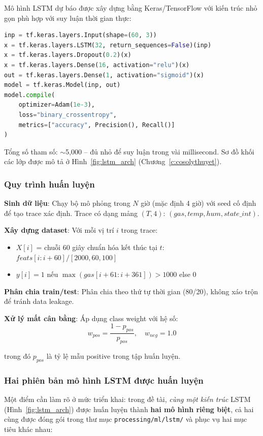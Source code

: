 Mô hình LSTM dự báo được xây dựng bằng Keras/TensorFlow với kiến trúc nhỏ gọn phù hợp với suy luận thời gian thực:

\begin{lstlisting}[language=Python, caption={Định nghĩa kiến trúc LSTM}]
inp = tf.keras.layers.Input(shape=(60, 3))
x = tf.keras.layers.LSTM(32, return_sequences=False)(inp)
x = tf.keras.layers.Dropout(0.2)(x)
x = tf.keras.layers.Dense(16, activation="relu")(x)
out = tf.keras.layers.Dense(1, activation="sigmoid")(x)
model = tf.keras.Model(inp, out)
model.compile(
    optimizer=Adam(1e-3),
    loss="binary_crossentropy",
    metrics=["accuracy", Precision(), Recall()]
)
\end{lstlisting}

Tổng số tham số: $\sim$5,000 – đủ nhỏ để suy luận trong vài millisecond. Sơ đồ khối các lớp được mô tả ở Hình~\ref{fig:lstm_arch} (Chương~\ref{c:cosolythuyet}).

\subsubsection{Quy trình huấn luyện}

\textbf{Sinh dữ liệu}: Chạy bộ mô phỏng trong $N$ giờ (mặc định 4 giờ) với seed cố định để tạo trace xác định. Trace có dạng mảng $(T, 4)$: $(gas, temp, hum, state\_int)$.

\textbf{Xây dựng dataset}: Với mỗi vị trí $i$ trong trace:
\begin{itemize}
  \item $X[i]$ = chuỗi 60 giây chuẩn hóa kết thúc tại $t$: $feats[i:i+60] / [2000, 60, 100]$
  \item $y[i] = 1$ nếu $\max(gas[i+61:i+361]) > 1000$ else $0$
\end{itemize}

\textbf{Phân chia train/test}: Phân chia theo thứ tự thời gian (80/20), không xáo trộn để tránh data leakage.

\textbf{Xử lý mất cân bằng}: Áp dụng class weight với hệ số:
\[w_{pos} = \frac{1 - p_{pos}}{p_{pos}}, \quad w_{neg} = 1.0\]

trong đó $p_{pos}$ là tỷ lệ mẫu positive trong tập huấn luyện.

\subsubsection{Hai phiên bản mô hình LSTM được huấn luyện}
\label{sssec:lstm_two_models}

Một điểm cần làm rõ ở mức triển khai: trong đề tài, \emph{cùng một kiến trúc} LSTM (Hình~\ref{fig:lstm_arch}) được huấn luyện thành \textbf{hai mô hình riêng biệt}, cả hai cùng được đóng gói trong thư mục \texttt{processing/ml/lstm/} và phục vụ hai mục tiêu khác nhau:

